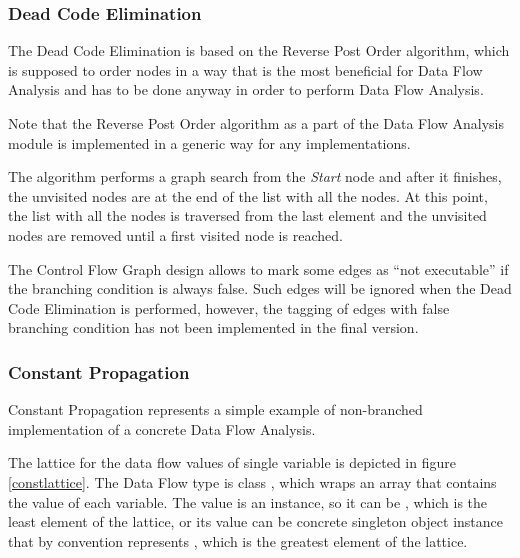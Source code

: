         \subsubsection*{Dead Code Elimination}
        
        The Dead Code Elimination is based on the Reverse Post Order 
        algorithm, which is supposed to order nodes in a way that 
        is the most beneficial for Data Flow Analysis and has to be 
        done anyway in order to perform Data Flow Analysis.
        
        Note that the Reverse Post Order algorithm as a part 
        of the Data Flow Analysis module is implemented 
        in a generic way for any  implementations. 
        
        The algorithm performs a graph search from the \emph{Start} 
        node and after it finishes, the unvisited nodes are 
        at the end of the list with all the nodes. At this point, 
        the list with all the nodes is traversed from the last 
        element and the unvisited nodes are removed until a 
        first visited node is reached.
        
        The Control Flow Graph design allows to mark 
        some edges as ``not executable'' if the branching 
        condition is always false. Such edges will be ignored 
        when the Dead Code Elimination is performed, however, 
        the tagging of edges with false branching condition 
        has not been implemented in the final version.
        
        \subsubsection*{Constant Propagation}
        Constant Propagation represents a simple example of non-branched 
        implementation of a concrete Data Flow Analysis. 
        
        The lattice for the data flow values of single variable is 
        depicted in figure \ref{constlattice}. The Data Flow type is class 
        , which wraps an array 
        that contains the value of each variable. 
        The value is an  instance, so it can be , which 
        is the least element of the lattice, or its value can be concrete 
        singleton object instance that by convention represents 
        , which is the greatest element of the lattice.
        
